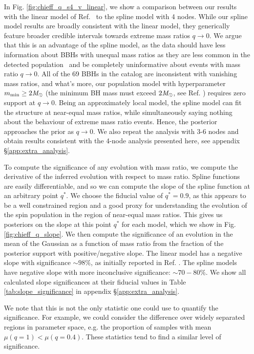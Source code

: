 \begin{refsection}
In Fig. \ref{fig:chieff_q_s4_v_linear}, we show a comparison between our results with the linear model of Ref.~\cite{Callister:2021fpo} to the spline model with 4 nodes. While our spline model results are broadly consistent with the linear model, they generically feature broader credible intervals towards extreme mass ratios $q \to 0$. We argue that this is an advantage of the spline model, as the data should have less information about BBHs with unequal mass ratios as they are less common in the detected population~\cite[e.g.,][]{Fishbach:2019bbm, Farah:2023swu} and be completely uninformative about events with mass ratio $q \to 0$. All of the 69 BBHs in the catalog are inconsistent with vanishing mass ratios, and what's more, our population model with hyperparameter $m_{\rm min} \ge 2\mathit{M_\odot}$ (the minimum BH mass must exceed $2\mathit{M_\odot}$, see Ref. \cite{Talbot:2018cva}) requires zero support at $q\to0$. Being an approximately local model, the spline model can fit the structure at near-equal mass ratios, while simultaneously saying nothing about the behaviour of extreme mass ratio events. Hence, the posterior approaches the prior as $q\to 0$. We also repeat the analysis with 3-6 nodes and obtain results consistent with the 4-node analysis presented here, see appendix \S \ref{app:extra_analysis}.

To compute the significance of any evolution with mass ratio, we compute the derivative of the inferred evolution with respect to mass ratio. Spline functions are easily differentiable, and so we can compute the slope of the spline function at an arbitrary point $q^*$. We choose the fiducial value of $q^* = 0.9$, as this appears to be a  well constrained region and a good proxy for understanding the evolution of the spin population in the region of near-equal mass ratios. This gives us posteriors on the slope at this point $q^*$ for each model, which we show in Fig. \ref{fig:chieff_q_slope}. We then compute the significance of an evolution in the mean of the Gaussian as a function of mass ratio from the fraction of the posterior support with positive/negative slope. The linear model has a negative slope with significance $\sim 98\%$, as initially reported in Ref. \cite{Callister:2021fpo}. The spline models have negative slope with more inconclusive significance: $\sim 70-80\%$. We show all calculated slope significances at their fiducial values in Table \ref{tab:slope_significance} in appendix \S \ref{app:extra_analysis}. 

We note that this is not the only statistic one could use to quantify the significance. For example, we could consider the difference over widely separated regions in parameter space, e.g. the proportion of samples with mean $\mu(q=1) < \mu(q=0.4)$. These statistics tend to find a similar level of significance.


\end{refsection}
